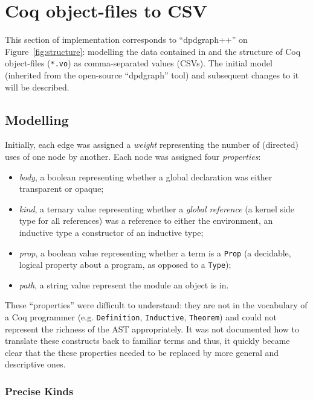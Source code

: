 \section{Coq object-files to CSV}

This section of implementation corresponds to ``dpdgraph++'' on
Figure~\ref{fig:structure}: modelling the data contained in and the structure
of Coq object-files (\texttt{*.vo}) as comma-separated values (CSVs). The
initial model (inherited from the open-source ``dpdgraph'' tool) and subsequent
changes to it will be described.

\subsection{Modelling}

Initially, each edge was assigned a \emph{weight} representing the number of
(directed) uses of one node by another. Each node was assigned four
\emph{properties}: 

\begin{itemize}
  \item \emph{body}, a boolean representing whether a global declaration was
    either transparent or opaque;
  
  \item \emph{kind}, a ternary value representing whether a \emph{global
    reference} (a kernel side type for all references) was a reference to either
    the environment, an inductive type a constructor of an inductive type;

  \item \emph{prop}, a boolean value representing whether a term is a \texttt{Prop}
    (a decidable, logical property about a program, as opposed to a
    \texttt{Type});

  \item \emph{path}, a string value represent the module an object is in.
\end{itemize}

These ``properties'' were difficult to understand: they are not in the
vocabulary of a Coq programmer (e.g. \texttt{Definition}, \texttt{Inductive},
\texttt{Theorem}) and could not represent the richness of the
AST appropriately. It was not documented how to translate these constructs back
to familiar terms and thus, it quickly became clear that the these properties
needed to be replaced by more general and descriptive ones.

\subsubsection{Precise Kinds}

